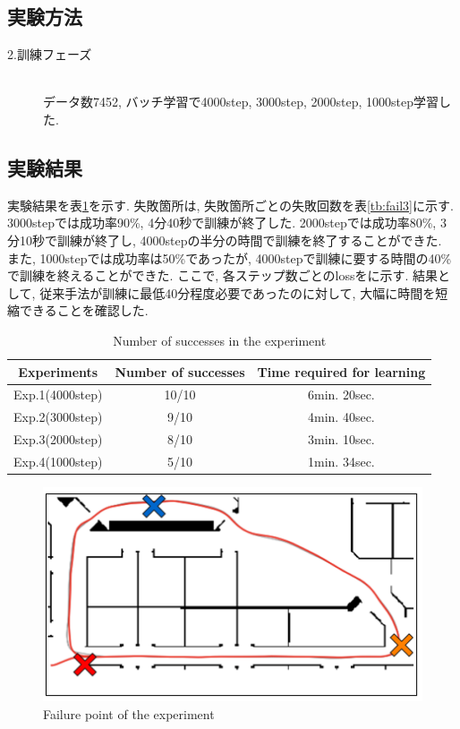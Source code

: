 \subsection{実験方法}
\begin{description}
  \item[2.訓練フェーズ]\mbox{}\\データ数7452, バッチ学習で4000step, 3000step, 2000step, 1000step学習した. 
\end{description}

\subsection{実験結果}
実験結果を表\ref{tb:exp3}を示す. 失敗箇所は, 失敗箇所ごとの失敗回数を表\ref{tb:fail3}に示す. 3000stepでは成功率90\%, 4分40秒で訓練が終了した. 2000stepでは成功率80\%, 3分10秒で訓練が終了し, 4000stepの半分の時間で訓練を終了することができた. また, 1000stepでは成功率は50\%であったが, 4000stepで訓練に要する時間の40\%で訓練を終えることができた. ここで, 各ステップ数ごとのlossをに示す. 結果として, 従来手法が訓練に最低40分程度必要であったのに対して, 大幅に時間を短縮できることを確認した. 

\begin{table}[h]
  \centering
  \begin{tabular}{|c|c|c|} \hline
    Experiments & Number of successes & Time required for learning\\ \hline
    Exp.1(4000step) & 10/10 & 6min. 20sec.\\ \hline
    Exp.2(3000step) & 9/10 & 4min. 40sec.\\ \hline
    Exp.3(2000step) & 8/10 & 3min. 10sec.\\ \hline
    Exp.4(1000step) & 5/10 & 1min. 34sec.\\ \hline
  \end{tabular}
  \caption{Number of successes in the experiment}
  \label{tb:exp3}
\end{table}

\begin{figure}[h]
  \centering
  \includegraphics[keepaspectratio, scale=0.5]{images/result4.png}
  \caption{Failure point of the experiment}
  \label{Fig:result3}
  \end{figure}

